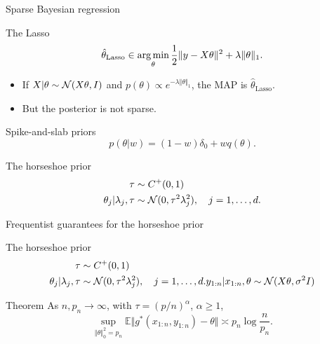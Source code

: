 \documentclass[10pt]{beamer}
\begin{document}
\begin{frame}{Sparse Bayesian regression}
\begin{block}{The Lasso}
$$ 
\hat\theta_{\text{Lasso}} \in \operatorname*{arg\,min}_\theta \frac12 \Vert y -X\theta\Vert^2 + \lambda \Vert \theta\Vert_1.
$$
\end{block}
\begin{itemize}
\item If $X\vert\theta \sim \mathcal{N}(X\theta, I)$ and $p(\theta) \propto e^{-\lambda\Vert \theta\Vert_1}$, the MAP is $\hat\theta_{\text{Lasso}}$.
\item But the posterior is not sparse.
\end{itemize}
\begin{block}{Spike-and-slab priors}
  \vspace{-5pt}
  $$
    p(\theta\vert w) = (1-w)\delta_0 + w q(\theta).
  $$
\end{block}

\begin{block}{The horseshoe prior \citep{CaPoSc10}}
  \vspace{-15pt}
  \begin{align*}
    \tau& \sim C^+(0,1)\\
    \theta_j\vert \lambda_j, \tau &\sim \mathcal{N}(0, \tau^2 \lambda_j^2), \quad j=1,\dots, d.
  \end{align*}
\end{block}
\end{frame}

\begin{frame}{Frequentist guarantees for the horseshoe prior}
  \begin{block}{The horseshoe prior \citep{CaPoSc10}}
    \vspace{-15pt}
    \begin{align*}
      \tau& \sim C^+(0,1)\\
      \theta_j\vert \lambda_j, \tau &\sim \mathcal{N}(0, \tau^2 \lambda_j^2), \quad j=1,\dots, d.
      y_{1:n} \vert x_{1:n}, \theta \sim \mathcal{N}(X\theta, \sigma^2 I)
    \end{align*}
  \end{block}
  \vfill
  \begin{block}{Theorem \citep{PaKlVa14}}
    As $n, p_n\rightarrow\infty$, with $\tau = (p/n)^\alpha$, $\alpha\geq 1$, 
    $$
    \sup_{\Vert\theta\Vert^2_0 = p_n} \mathbb E\Vert g^*(x_{1:n},y_{1:n})-\theta\Vert \asymp p_n \log\frac{n}{p_n}.
    $$
  \end{block}
  

\end{frame}
\end{document}
